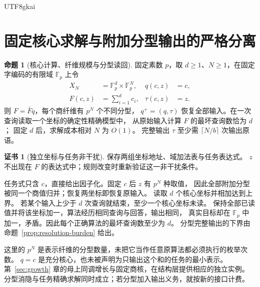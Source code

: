 \documentclass[12pt]{report}
\makeatletter
\theoremstyle{definition}
\newtheorem{proposition}{命题}[chapter]
\newtheorem{Certificate}{证书}[chapter]
\renewenvironment{proof}[1][\proofname]{\par
  \pushQED{\qed}\normalfont
  \topsep6\p@\@plus6\p@\relax
  \trivlist
  \item[\hskip\labelsep\normalfont #1\@addpunct{.}]\ignorespaces
}{
  \popQED\endtrivlist\@endpefalse
}
\makeatother
\begin{document}
\begin{CJK*}{UTF8}{gkai}
\section{固定核心求解与附加分型输出的严格分离}
\begin{proposition}[核心计算、纤维规模与分型读回]
\label{prop:core-typing-tradeoff}
固定素数 \(p\)，取 \(d\ge1\)、\(N\ge1\)，在固定字编码的有限域 \(\mathbb F_p\) 上令
\[
\begin{aligned}
X_N&=\mathbb F_p^d\times\mathbb F_p^N, & q(c,z)&=c,\\
F(c,z)&=\sum_{i=1}^d c_i, & \tau(c,z)&=z.
\end{aligned}
\]
则 \(F=\bar Fq\)，每个商纤维有 \(p^N\) 个不同分型，
\(q^+=(q,\tau)\) 恢复全部输入。在一次查询读取一个坐标的确定性精确模型中，
从原始输入计算 \(F\) 的最坏查询数恰为 \(d\)；
固定 \(d\) 后，求解成本相对 \(N\) 为 \(O(1)\)。
完整输出 \(\tau\) 至少需 \(\lceil N/b\rceil\) 次输出原语。
\end{proposition}
\begin{Certificate}[独立坐标与任务非干扰]
保存两组坐标地址、域加法表与任务表达式。
\(z\) 不出现在 \(F\) 的表达式中；规则改变时重新验证这一非干扰条件。
\end{Certificate}
\begin{proof}
任务式只含 \(c\)，直接给出因子化。固定 \(c\) 后 \(z\) 有 \(p^N\) 种取值，
因此全部附加分型被同一个商值归并；恢复两坐标即恢复原输入。
读取 \(d\) 个核心坐标并相加达到上界。
若某个输入上少于 \(d\) 次查询就结束，至少一个核心坐标未读。
保持全部已读值并将该坐标加一，算法经历相同查询与回答，输出相同，
真实目标却在 \(\mathbb F_p\) 中加一，矛盾。因此每个正确算法的最坏查询数至少为 \(d\)。
分型完整输出的下界由命题~\ref{prop:resolution-burden} 给出。
\end{proof}
这里的 \(p^N\) 是表示纤维的分型数量，未把它当作任意原算法都必须执行的枚举次数。
\(q=c\) 是充分核心，也未被声明为只输出这个和的任务的最小表示。
第~\ref{sec:growth} 章的母上同调增长与固定商核，在结构层提供相应的独立实例。
分型消隐与任务精确求解同时成立；若分型加入输出义务，就按新的接口计费。


\end{CJK*}
\end{document}
